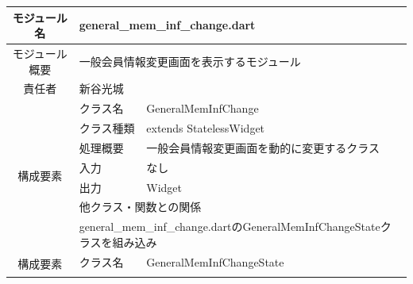 \begin{table}[H]
  \centering
  \begin{tabular}{|c|l|l|} \hline
    モジュール名                & \multicolumn{2}{l|}{general\_mem\_inf\_change.dart}                                                                                           \\ \hline
    モジュール概要               & \multicolumn{2}{p{12cm}|}{一般会員情報変更画面を表示するモジュール}                                                                                               \\ \hline
    責任者                   & \multicolumn{2}{l|}{新谷光城}                                                                                                                     \\ \hline
    \multirow{7}{*}{構成要素} & クラス名                                                                                       & GeneralMemInfChange                              \\ \cline{2-3}
                          & クラス種類                                                                                      & extends StatelessWidget                          \\ \cline{2-3}
                          & 処理概要                                                                                       & \multicolumn{1}{p{12cm}|}{一般会員情報変更画面を動的に変更するクラス} \\ \cline{2-3}
                          & 入力                                                                                         & なし                                               \\ \cline{2-3}
                          & 出力                                                                                         & Widget                                           \\ \cline{2-3}
                          & \multicolumn{2}{l|}{他クラス・関数との関係}                                                                                                              \\ \cline{2-3}
                          & \multicolumn{2}{p{14cm}|}{general\_mem\_inf\_change.dartのGeneralMemInfChangeStateクラスを組み込み}                                                    \\ \hline
    \multirow{7}{*}{構成要素} & クラス名                                                                                       & GeneralMemInfChangeState                         \\ \cline{2-3}

\end{tabular}
\end{table}
